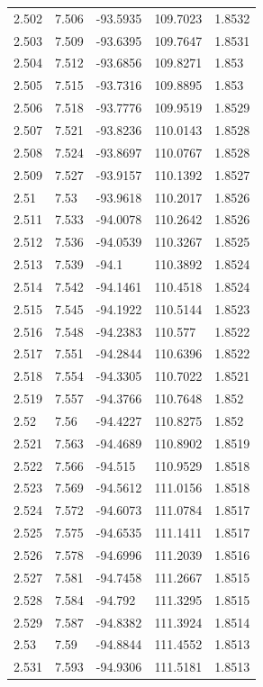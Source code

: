 \begin{tabular}{lllll}
2.502 & 7.506 & -93.5935 & 109.7023 & 1.8532 \\
2.503 & 7.509 & -93.6395 & 109.7647 & 1.8531 \\
2.504 & 7.512 & -93.6856 & 109.8271 & 1.853 \\
2.505 & 7.515 & -93.7316 & 109.8895 & 1.853 \\
2.506 & 7.518 & -93.7776 & 109.9519 & 1.8529 \\
2.507 & 7.521 & -93.8236 & 110.0143 & 1.8528 \\
2.508 & 7.524 & -93.8697 & 110.0767 & 1.8528 \\
2.509 & 7.527 & -93.9157 & 110.1392 & 1.8527 \\
2.51 & 7.53 & -93.9618 & 110.2017 & 1.8526 \\
2.511 & 7.533 & -94.0078 & 110.2642 & 1.8526 \\
2.512 & 7.536 & -94.0539 & 110.3267 & 1.8525 \\
2.513 & 7.539 & -94.1 & 110.3892 & 1.8524 \\
2.514 & 7.542 & -94.1461 & 110.4518 & 1.8524 \\
2.515 & 7.545 & -94.1922 & 110.5144 & 1.8523 \\
2.516 & 7.548 & -94.2383 & 110.577 & 1.8522 \\
2.517 & 7.551 & -94.2844 & 110.6396 & 1.8522 \\
2.518 & 7.554 & -94.3305 & 110.7022 & 1.8521 \\
2.519 & 7.557 & -94.3766 & 110.7648 & 1.852 \\
2.52 & 7.56 & -94.4227 & 110.8275 & 1.852 \\
2.521 & 7.563 & -94.4689 & 110.8902 & 1.8519 \\
2.522 & 7.566 & -94.515 & 110.9529 & 1.8518 \\
2.523 & 7.569 & -94.5612 & 111.0156 & 1.8518 \\
2.524 & 7.572 & -94.6073 & 111.0784 & 1.8517 \\
2.525 & 7.575 & -94.6535 & 111.1411 & 1.8517 \\
2.526 & 7.578 & -94.6996 & 111.2039 & 1.8516 \\
2.527 & 7.581 & -94.7458 & 111.2667 & 1.8515 \\
2.528 & 7.584 & -94.792 & 111.3295 & 1.8515 \\
2.529 & 7.587 & -94.8382 & 111.3924 & 1.8514 \\
2.53 & 7.59 & -94.8844 & 111.4552 & 1.8513 \\
2.531 & 7.593 & -94.9306 & 111.5181 & 1.8513 \\

\end{tabular}

